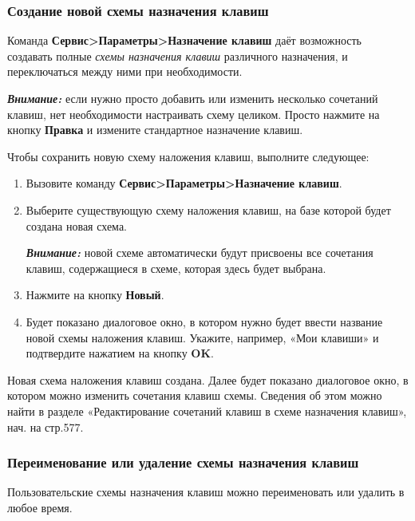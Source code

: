 ﻿\documentclass[a4paper,10pt]{article}
\begin{document}
 \subsubsection{Создание новой схемы назначения клавиш}
 Команда \textbf{Сервис>Параметры>Назначение клавиш} даёт возможность создавать полные \textit{схемы назначения клавиш} различного назначения, и переключаться между ними при необходимости.
 
 \begin{mdframed}[backgroundcolor=blue!10]
\textbf{\textit{Внимание:}} если нужно просто добавить или изменить несколько сочетаний клавиш, нет необходимости настраивать схему целиком. Просто нажмите на кнопку \textbf{Правка} и измените стандартное назначение клавиш.
\end{mdframed}
 
 Чтобы сохранить новую схему наложения клавиш, выполните следующее:
 \begin{enumerate}
  \item Вызовите команду \textbf{Сервис>Параметры>Назначение клавиш}.
  \item Выберите существующую схему наложения клавиш, на базе которой будет создана новая схема.
  
  \begin{mdframed}[backgroundcolor=blue!10]
\textbf{\textit{Внимание:}} новой схеме автоматически будут присвоены все сочетания клавиш, содержащиеся в схеме, которая здесь будет выбрана.
\end{mdframed}
\item Нажмите на кнопку \textbf{Новый}.
\item Будет показано диалоговое окно, в котором нужно будет ввести название новой схемы наложения клавиш. Укажите, например, «Мои клавиши» и подтвердите нажатием на кнопку \textbf{OK}.
 \end{enumerate}

 
 Новая схема наложения клавиш создана. Далее будет показано диалоговое окно, в котором можно изменить сочетания клавиш схемы. Сведения об этом можно найти в разделе «Редактирование сочетаний клавиш в схеме назначения клавиш», нач. на стр.577.
 
 \subsubsection{Переименование или удаление схемы назначения клавиш}
 Пользовательские схемы назначения клавиш можно переименовать или удалить в любое время.
 
\end{document}
